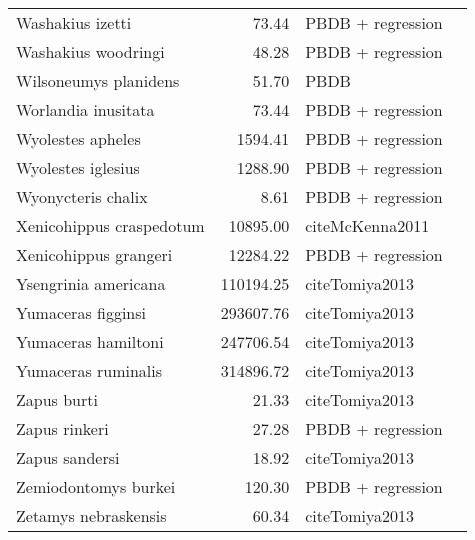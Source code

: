 \begin{table}[ht]
\begin{tabular}{lrll}
  Washakius izetti & 73.44 & PBDB + regression &  \\ 
  Washakius woodringi & 48.28 & PBDB + regression &  \\ 
  Wilsoneumys planidens & 51.70 & PBDB &  \\ 
  Worlandia inusitata & 73.44 & PBDB + regression &  \\ 
  Wyolestes apheles & 1594.41 & PBDB + regression &  \\ 
  Wyolestes iglesius & 1288.90 & PBDB + regression &  \\ 
  Wyonycteris chalix & 8.61 & PBDB + regression &  \\ 
  Xenicohippus craspedotum & 10895.00 & cite{McKenna2011} &  \\ 
  Xenicohippus grangeri & 12284.22 & PBDB + regression &  \\ 
  Ysengrinia americana & 110194.25 & cite{Tomiya2013} &  \\ 
  Yumaceras figginsi & 293607.76 & cite{Tomiya2013} &  \\ 
  Yumaceras hamiltoni & 247706.54 & cite{Tomiya2013} &  \\ 
  Yumaceras ruminalis & 314896.72 & cite{Tomiya2013} &  \\ 
  Zapus burti & 21.33 & cite{Tomiya2013} &  \\ 
  Zapus rinkeri & 27.28 & PBDB + regression &  \\ 
  Zapus sandersi & 18.92 & cite{Tomiya2013} &  \\ 
  Zemiodontomys burkei & 120.30 & PBDB + regression &  \\ 
  Zetamys nebraskensis & 60.34 & cite{Tomiya2013} &  \\ 
   \hline
\end{tabular}
\label{tab:mass_data}
\end{table}
